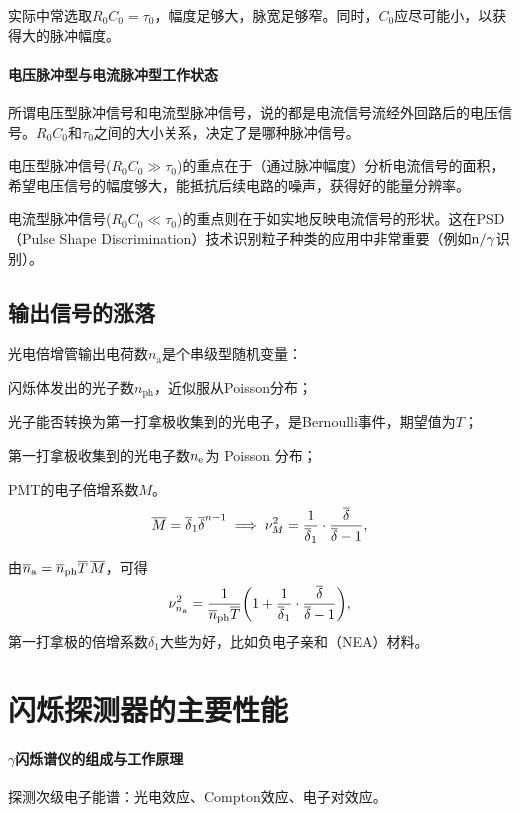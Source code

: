 实际中常选取$R_0C_0 = \tau_0$，幅度足够大，脉宽足够窄。同时，$C_0$应尽可能小，以获得大的脉冲幅度。
\paragraph{电压脉冲型与电流脉冲型工作状态}
所谓电压型脉冲信号和电流型脉冲信号，说的都是电流信号流经外回路后的电压信号。$R_0C_0$和$\tau_0$之间的大小关系，决定了是哪种脉冲信号。
\begin{compactitem}
	\item 电压型脉冲信号($R_0C_0 \gg \tau_0$)的重点在于（通过脉冲幅度）分析电流信号的面积，希望电压信号的幅度够大，能抵抗后续电路的噪声，获得好的能量分辨率。
	\item 电流型脉冲信号($R_0C_0 \ll \tau_0$)的重点则在于如实地反映电流信号的形状。这在PSD （Pulse Shape Discrimination）技术识别粒子种类的应用中非常重要（例如$\mathrm n/\gamma$识别）。
\end{compactitem}

\subsection{输出信号的涨落}

光电倍增管输出电荷数$n_{\mathrm{a}}$是个串级型随机变量：
\begin{compactitem}
	\item 闪烁体发出的光子数$n_{\mathrm{ph}}$，近似服从Poisson分布；
	\item 光子能否转换为第一打拿极收集到的光电子，是Bernoulli事件，期望值为$T$；
	\item 第一打拿极收集到的光电子数$n_{\mathrm{e}}$为 Poisson 分布；
	\item PMT的电子倍增系数$M$。
	\[
		\overline{M} = \overline{\delta}_1\overline{\delta}^{n-1} \implies \nu_M^2 = \frac1{\overline{\delta}_1} \cdot \frac{\overline{\delta}}{\overline{\delta} - 1},
	\]
\end{compactitem}
由$\overline{n}_{\mathrm{a}} = \overline{n}_{\mathrm{ph}}\overline{T}\,\overline{M}$，可得
\begin{align}
	\nu_{n_{\mathrm{a}}}^2 = \frac1{\overline{n}_{\mathrm{ph}}\overline{T}}\biggl(1 + \frac1{\overline{\delta}_1} \cdot \frac{\overline{\delta}}{\overline{\delta} - 1}\biggr),
\end{align}
第一打拿极的倍增系数$\delta_1$大些为好，比如负电子亲和（NEA）材料。

\section{闪烁探测器的主要性能}

\paragraph{$\gamma$闪烁谱仪的组成与工作原理}
探测次级电子能谱：光电效应、Compton效应、电子对效应。

